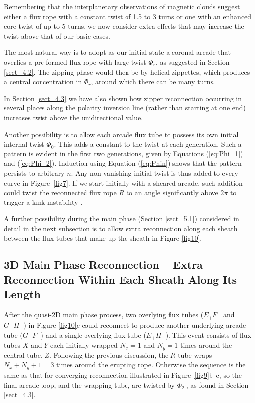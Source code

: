\documentclass[10pt,namedreferneces]{SolarPhysics}
\begin{document}
\begin{article}
Remembering that the interplanetary observations of magnetic clouds \cite{hu14} suggest either a flux rope with a constant twist of 1.5 to 3 turns or one with an enhanced core twist of up to 5 turns, we now consider extra effects that may increase the twist above that of our basic cases. 

The most natural way is to adopt as our initial state a coronal arcade that overlies a pre-formed flux rope with large twist $\Phi_r$, as suggested in Section \ref{sect_4.2}.  The zipping phase would then be by helical zippettes, which produces a central concentration in $\Phi_r$, around which there can be many turns.

In Section \ref{sect_4.3} we have also shown how zipper reconnection occurring in several places along the polarity inversion line (rather than starting at one end) increases twist above the unidirectional value.

Another possibility is to allow each arcade flux tube to possess its own initial internal twist $\Phi_0$. This adds a constant to the twist at each generation.  Such a pattern is 
evident in the first two generations, given by Equations (\ref{eq:Phi_1}) and (\ref{eq:Phi_2}).  Induction using Equation (\ref{eq:Phin}) shows that the pattern persists to arbitrary $n$.  Any non-vanishing initial twist is thus added to every curve in Figure\ \ref{fig7}.  If we start initially with a sheared arcade, such addition could twist the reconnected flux rope $R$ to an angle significantly above $2\pi$ to trigger a kink instability \cite{hood79a}.

A further possibility  during the main phase (Section \ref{sect_5.1}) considered in detail in the next subsection is to allow extra reconnection along each sheath between the flux tubes that make up the sheath  in Figure \ref{fig10}. 

\subsection{\bf 3D Main Phase Reconnection -- Extra Reconnection Within Each Sheath Along Its Length}
\label{sect_5.3}
After the quasi-2D main phase process, two overlying flux tubes ($E_+F_-$ and $G_+H_-$) in Figure \ref{fig10}c could reconnect to produce another underlying arcade tube ($G_+F_-$) and a single overlying flux tube ($E_+H_-$).  This event consists of flux tubes $X$ and $Y$ each initially wrapped $N_x=1$ and $N_y=1$ times around the central tube, $Z$.  Following the previous discussion, the $R$ tube wraps $N_x+N_y+1=3$ times around the erupting rope.  Otherwise the sequence is the same as that for converging reconnection illustrated in Figure\ \ref{fig9}b--c, so the final arcade loop, and the wrapping tube, are twisted by $\Phi_{2'}$, as found in Section \ref{sect_4.3}.


\end{article}
\end{document}
